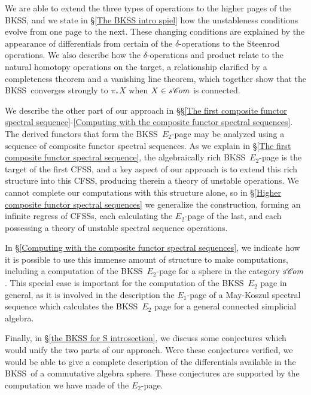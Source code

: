 \documentclass[11pt]{amsart} \renewcommand{\baselinestretch}{1.2}
\theoremstyle{plain}
\numberwithin{equation}{section} %
\theoremstyle{plain}
\numberwithin{equation}{chapter} %
\newcommand{\scrC}{\mathscr{C}}
\newcommand{\algs}{{\scrC\!\textit{\normalfont\textit{om}}}}
\newcommand{\BKSS}{BKSS}
\newcommand{\CFSS}{CFSS}
\newcommand{\CFSSs}{CFSSs}
\begin{document}
\begin{Introduction}
We are able to extend the three types of operations to the higher pages of the \BKSS, and we state in \S\ref{The BKSS intro spiel}   how the unstableness conditions evolve from one page to the next. These changing conditions are explained by the appearance of differentials from certain of the $\delta$-operations to the Steenrod operations.
%
%
We also describe how the $\delta$-operations and product relate to the natural homotopy operations on the target, a relationship clarified by a completeness theorem and a vanishing line theorem, which together show that the \BKSS\ converges strongly to $\pi_*X$ when $X\in s\algs$ is connected.


We describe the other part of our approach in \S\S\ref{The first composite functor spectral sequence}-\ref{Computing with the composite functor spectral sequences}. The derived functors that form the \BKSS\ $E_2$-page may be analyzed using a sequence of composite functor spectral sequences. As we explain in \S\ref{The first composite functor spectral sequence}, the algebraically rich \BKSS\ $E_2$-page is the target of the first \CFSS, %
and a key aspect of our approach is to extend this rich structure into this \CFSS, producing therein a theory of unstable operations. 
We cannot complete our computations with this structure alone, so in \S\ref{Higher composite functor spectral sequences} we generalize the construction, forming an infinite regress of \CFSSs, each calculating the $E_2$-page of the last, and each possessing a theory of unstable spectral sequence operations.

In \S\ref{Computing with the composite functor spectral sequences}, we indicate how it is possible to use this immense amount of structure to make computations, including a computation of the \BKSS\ $E_2$-page for a sphere in the category $s\algs$. This special case is important for the computation of the \BKSS\ $E_2$ page in general, as it is involved in the description the $E_1$-page of a May-Koszul spectral sequence which calculates the \BKSS\ $E_2$ page for a general connected simplicial algebra.

Finally, in \S\ref{the BKSS for S introsection}, we discuss some conjectures which would unify the two parts of our approach. Were these conjectures verified, we would be able to give a complete description of the differentials available in the \BKSS\ of a commutative algebra sphere. These conjectures are supported by the computation we have made of the $E_2$-page.


\end{Introduction}
\end{document}
